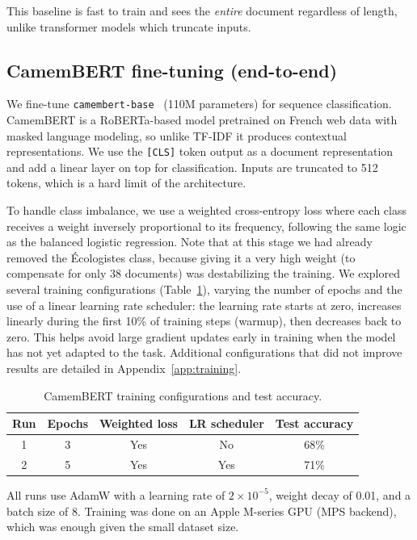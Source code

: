 \documentclass{article}
\begin{document}
This baseline is fast to train and sees the \emph{entire} document regardless of length, unlike transformer models which truncate inputs.

\subsection{CamemBERT fine-tuning (end-to-end)}

We fine-tune \texttt{camembert-base}~\citep{martin2020camembert} (110M parameters) for sequence classification. CamemBERT is a RoBERTa-based model pretrained on French web data with masked language modeling, so unlike TF-IDF it produces contextual representations. We use the \texttt{[CLS]} token output as a document representation and add a linear layer on top for classification. Inputs are truncated to 512 tokens, which is a hard limit of the architecture.

To handle class imbalance, we use a weighted cross-entropy loss where each
class receives a weight inversely proportional to its frequency, following
the same logic as the balanced logistic regression. Note that at this stage
we had already removed the \'Ecologistes class, because giving it a very
high weight (to compensate for only 38 documents) was destabilizing the
training. We explored several training configurations (Table~\ref{tab:configs}),
varying the number of epochs and the use of a linear learning rate scheduler:
the learning rate starts at zero, increases linearly during the first 10\%
of training steps (warmup), then decreases back to zero. This helps avoid
large gradient updates early in training when the model has not yet adapted
to the task. Additional configurations that did not improve results are
detailed in Appendix~\ref{app:training}.

\begin{table}[h]
  \caption{CamemBERT training configurations and test accuracy.}
  \label{tab:configs}
  \centering
  \begin{tabular}{ccccc}
    \toprule
    Run & Epochs & Weighted loss & LR scheduler & Test accuracy \\
    \midrule
    1 & 3 & Yes & No  & 68\% \\
    2 & 5 & Yes & Yes & 71\% \\
    \bottomrule
  \end{tabular}
\end{table}

All runs use AdamW with a learning rate of $2 \times 10^{-5}$, weight decay of 0.01, and a batch size of 8. Training was done on an Apple M-series GPU (MPS backend), which was enough given the small dataset size.
\end{document}
